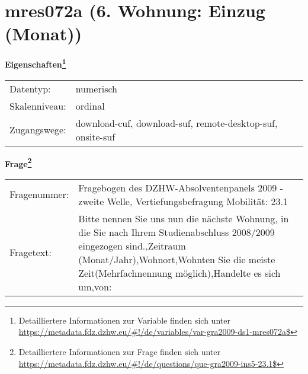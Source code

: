 
    \setcounter{footnote}{0}

    \vspace*{-1.8cm}
	\section{mres072a (6. Wohnung: Einzug (Monat))}
	\label{section:mres072a}



    \vspace*{0.5cm}
    \noindent\textbf{Eigenschaften\footnote{Detailliertere Informationen zur Variable finden sich unter
		\url{https://metadata.fdz.dzhw.eu/\#!/de/variables/var-gra2009-ds1-mres072a$}}}\\
	\begin{tabularx}{\hsize}{@{}lX}
	Datentyp: & numerisch \\
	Skalenniveau: & ordinal \\
	Zugangswege: &
	  download-cuf, 
	  download-suf, 
	  remote-desktop-suf, 
	  onsite-suf
 \\
    \end{tabularx}



				\vspace*{0.5cm}
                \noindent\textbf{Frage\footnote{Detailliertere Informationen zur Frage finden sich unter
		              \url{https://metadata.fdz.dzhw.eu/\#!/de/questions/que-gra2009-ins5-23.1$}}}\\
				\begin{tabularx}{\hsize}{@{}lX}
					Fragenummer: &
					  Fragebogen des DZHW-Absolventenpanels 2009 - zweite Welle, Vertiefungsbefragung Mobilität:
					  23.1
 \\
					Fragetext: & Bitte nennen Sie uns nun die nächste Wohnung, in die Sie nach Ihrem Studienabschluss 2008/2009 eingezogen sind.,Zeitraum (Monat/Jahr),Wohnort,Wohnten Sie die meiste Zeit(Mehrfachnennung möglich),Handelte es sich um,von: \\
				\end{tabularx}





